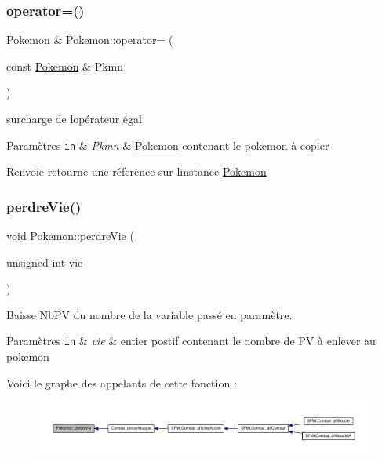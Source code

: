 \subsubsection{\texorpdfstring{operator=()}{operator=()}}
{\footnotesize\ttfamily \hyperlink{class_pokemon}{Pokemon} \& Pokemon\+::operator= (\begin{DoxyParamCaption}\item[{const \hyperlink{class_pokemon}{Pokemon} \&}]{Pkmn }\end{DoxyParamCaption})}



surcharge de l\textquotesingle{}opérateur égal 


\begin{DoxyParams}[1]{Paramètres}
\mbox{\tt in}  & {\em Pkmn} & \hyperlink{class_pokemon}{Pokemon} contenant le pokemon à copier \\
\hline
\end{DoxyParams}
\begin{DoxyReturn}{Renvoie}
retourne une réference sur l\textquotesingle{}instance \hyperlink{class_pokemon}{Pokemon} 
\end{DoxyReturn}
\mbox{\label{class_pokemon_aa036561ffd7e31e668b37785e88a8c51}} 
\subsubsection{\texorpdfstring{perdre\+Vie()}{perdreVie()}}
{\footnotesize\ttfamily void Pokemon\+::perdre\+Vie (\begin{DoxyParamCaption}\item[{unsigned int}]{vie }\end{DoxyParamCaption})}



Baisse Nb\+PV du nombre de la variable passé en paramètre. 


\begin{DoxyParams}[1]{Paramètres}
\mbox{\tt in}  & {\em vie} & entier postif contenant le nombre de PV à enlever au pokemon \\
\hline
\end{DoxyParams}
Voici le graphe des appelants de cette fonction \+:\nopagebreak
\begin{figure}[H]
\begin{center}
\leavevmode
\includegraphics[width=350pt]{class_pokemon_aa036561ffd7e31e668b37785e88a8c51_icgraph}
\end{center}
\end{figure}
\mbox{\label{class_pokemon_a30cc5a78e55f02b460c37f9b326864d9}} 
